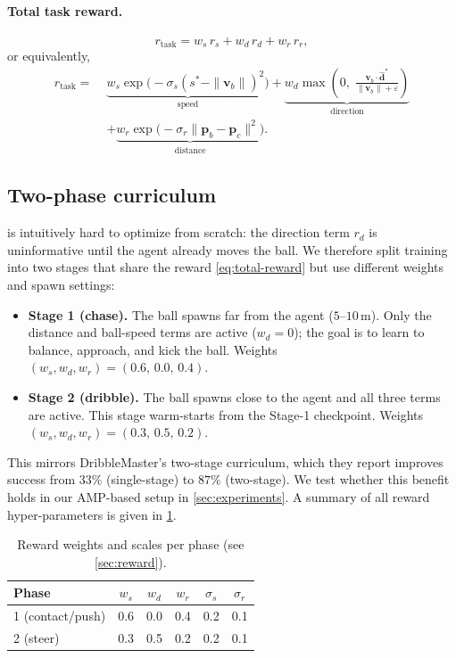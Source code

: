 \documentclass[10pt,twocolumn,letterpaper]{article}
\begin{document}
\paragraph{Total task reward.}
\begin{equation}
\label{eq:total-reward}
    r_\text{task} = w_s \, r_s + w_d \, r_d + w_r \, r_r,
\end{equation}
or equivalently,
\begin{equation}
\begin{aligned}
    r_\text{task} =\;
      &\underbrace{w_s \exp\!\bigl(-\sigma_s (s^* - \|\mathbf{v}_b\|)^2\bigr)}_{\text{speed}}
      + \underbrace{w_d \max\!\left(0,\; \tfrac{\mathbf{v}_b \cdot \hat{\mathbf{d}}^*}{\|\mathbf{v}_b\| + \varepsilon}\right)}_{\text{direction}}\\[-0.3em]
      &+ \underbrace{w_r \exp\!\bigl(-\sigma_r \|\mathbf{p}_b - \mathbf{p}_c\|^2\bigr)}_{\text{distance}}.
\end{aligned}
\end{equation}

\subsection{Two-phase curriculum}
\label{sec:curriculum}
 is intuitively hard to optimize from scratch: the
direction term $r_d$ is uninformative until the agent already moves the ball. We
therefore split training into two stages that share the reward
\eqref{eq:total-reward} but use different weights and spawn settings:
\begin{itemize}
    \item \textbf{Stage 1 (chase).} The ball spawns far from the agent
    ($5$--$10$\,m). Only the distance and ball-speed terms are active
    ($w_d = 0$); the goal is to learn to balance, approach, and kick the ball.
    Weights $(w_s, w_d, w_r) = (0.6,\,0.0,\,0.4)$.
    \item \textbf{Stage 2 (dribble).} The ball spawns close to the agent and all
    three terms are active. This stage warm-starts from the Stage-1 checkpoint.
    Weights $(w_s, w_d, w_r) = (0.3,\,0.5,\,0.2)$.
\end{itemize}
This mirrors DribbleMaster's two-stage curriculum, which they report improves
success from $33\%$ (single-stage) to $87\%$ (two-stage). We test whether this
benefit holds in our AMP-based setup in \cref{sec:experiments}. A summary of
all reward hyper-parameters is given in \cref{tab:hparams}.

\begin{table}[t]
\centering
\caption{Reward weights and scales per phase (see \cref{sec:reward}).}
\label{tab:hparams}
\begin{tabular}{lccccc}
\toprule
Phase & $w_s$ & $w_d$ & $w_r$ & $\sigma_s$ & $\sigma_r$ \\
\midrule
1 (contact/push) & 0.6 & 0.0 & 0.4 & 0.2 & 0.1 \\
2 (steer)        & 0.3 & 0.5 & 0.2 & 0.2 & 0.1 \\
\bottomrule
\end{tabular}
\end{table}
\end{document}
